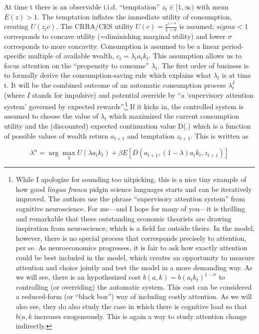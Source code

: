 \documentclass{article}
\begin{document}
At time t there is an observable i.i.d. “temptation” $z_t \in [1,\infty)$ with mean $E(z)>1$. The temptation inflates the immediate utility of consumption, creating $U(z_tc)$. The CRRA/CES utility $U(c)=\frac{c^{1-\sigma}} {1-\sigma }$ is assumed; $sigma<1$ corresponds to concave utility (=diminishing marginal utility) and lower $\sigma$ corresponds to more concavity. Consumption is assumed to be a linear period-specific multiple of available wealth, $c_t=\lambda_ta_tk_t$. This assumption allows us to focus attention on the “propensity to consume” $\lambda_t$. 
The first order of business is to formally derive the consumption-saving rule which explains what $\lambda_t$ is at time t. It will be the combined outcome of an automatic consumption process $\lambda^I_t$ (where $I$ stands for impulsive) and potential override by “a ‘supervisory attention system’ governed by expected rewards”.\footnote{While I apologize for sounding too nitpicking, this is a nice tiny example of how good \emph{lingua franca} pidgin science languages starts and can be iteratively improved. The authors use the phrase “supervisory attention system” from cognitive neuroscience. For me—and I hope for many of you—it is thrilling and remarkable that these outstanding economic theorists are drawing inspiration from neuroscience, which is a field far outside theirs. In the model, however, there is no special process that corresponds precisely to attention, per se. As neuroeconomics progresses,  it is fair to ask how exactly attention could be best included in the model, which creates an opportunity to measure attention and choice jointly and test the model in a more demanding way. As we will see, there is an hypothesized cost $b(a,k)=b(a_tk_t)^{1-\sigma}$ to controlling (or overriding) the automatic system. This cost can be considered a reduced-form (or “black box”) way of including costly attention. As we will also see, they do also study the case in which there is cognitive load so that $b(a,k$ increases exogeneously. This is again a way to study attention change indirectly.} If it kicks in, the controlled system is assumed to choose the value of $\lambda_t$ which maximized the current consumption utility and the (discounted) expected continuation value D(.) which is a function of possible values of wealth return $a_{t+1}$ and temptation $z_{t+1}$. This is written as 

\begin{equation*}
	\lambda^{\alpha}=\arg \max _{\lambda} U\left(\lambda a_{t} k_{t}\right)+\beta E\left[D\left(a_{t+1},(1-\lambda) a_{t} k_{t}, z_{t+1}\right)\right]
\end{equation*}
\end{document}
